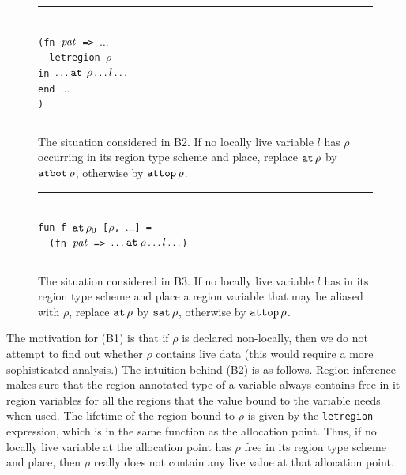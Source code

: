 \documentclass[12pt]{book}
\begin{document}
\begin{figure}
\hrule
\begin{center}
\begin{tabbing}
\\
\hskip3cm\=\tt (fn ${\it pat}$ => $\ldots$\\
       \>\ \ \=\tt letregion $\rho$ \\
       \>    \>\tt in  $\ldots\mathbin{\hbox{\tt at}}\,\rho\ldots l \ldots$\\
       \>    \>\tt end $\ldots$\\
       \>\tt )
\end{tabbing}
\end{center}
\caption{The situation considered in B2. If no locally live variable
  $l$ has $\rho$ occurring in its region type scheme and place, replace
  $\mathbin{\hbox{\tt at}}\,\rho$ by $\hbox{\tt atbot}\,\rho$, otherwise by $\hbox{\tt attop}\,\rho$.}
\medskip
\hrule
\label{b2.fig}
\end{figure}

\begin{figure}
\hrule
\begin{center}
\begin{tabbing}
\\
\hskip3cm\=\tt fun f $\mathbin{\hbox{\tt at}}\,\rho_0$ [$\rho$, $\ldots$] = \\
         \>\tt \ \ \=\tt (fn ${\it pat}$ => $\ldots\mathbin{\hbox{\tt at}}\rho\ldots l\ldots$)
\end{tabbing}
\end{center}
\caption{The situation considered in B3. If no locally live variable
  $l$ has in its region type scheme and place a region variable that may be
  aliased with $\rho$, replace $\mathbin{\hbox{\tt at}}\,\rho$ by $\hbox{\tt sat}\,\rho$, otherwise
  by $\hbox{\tt attop}\,\rho$.}  
\medskip
\hrule
\label{b3.fig}
\end{figure}
The motivation for (B1) is that if $\rho$ is declared non-locally,
then we do not attempt to find out whether $\rho$ contains live data (this would
require a more sophisticated analysis.) 
The intuition behind (B2) is as follows. Region inference
makes sure that the region-annotated type of a variable always contains
free in it region variables for all the regions that the value bound to the
variable needs when used. The lifetime of the region bound to 
$\rho$ is given by the {\tt letregion} expression, which is in the same function
as the allocation point. Thus,  
if no locally live variable at the allocation point
has $\rho$ free in its region type scheme and place,
then $\rho$ really does not contain any
live value at that allocation point.
\end{document}

